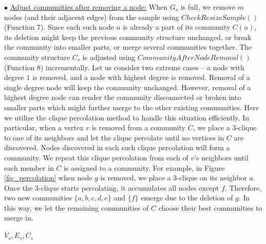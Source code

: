 \noindent$\bullet$ \underline{Adjust communities after removing a node:} When $G_s$ is full, we remove $m$ nodes (and their adjacent edges) from the sample using $CheckResizeSample()$ (Function 7). Since each such node $u$ is already a part of its community $C(u)$, its deletion might keep the previous community structure unchanged, or break the community into smaller parts, or merge several communities together. The community structure $C_s$ is adjusted using  $CommunityAfterNodeRemoval()$ (Function 8) incrementally.  Let us consider two extreme cases -- a node with degree $1$ is removed, and a node with highest degree is removed. Removal of a single degree node will keep the community unchanged. However, removal of a highest degree node can render the community disconnected or broken into smaller parts which might further merge to the other existing communities. Here we utilize the clique percolation method \cite{PalEtAl05} to handle this situation efficiently. In particular, when a vertex $v$ is removed from a community $C$, we place a 3-clique to one of its neighbors and let the clique percolate until no vertices in $C$ are discovered. Nodes discovered in each such clique percolation will form a community. We repeat this clique percolation from each of $v$'s neighbors until each member in $C$ is assigned to a community. For example, in Figure \ref{fig_percolation} when node $g$ is removed, we place a 3-clique on its neighbor $a$. Once the 3-clique starts percolating, it accumulates all nodes except $f$. Therefore, two new communities $\{a,b,c,d,e\}$ and $\{f\}$  emerge due to the deletion of $g$. In this way, we let the remaining communities of $C$ choose their best communities to merge in.%
\begin{function7}
\caption{$CheckResizeSample(V_s,C_s,n,m)$}
\Return $V_s,E_s,C_s$
\end{function7}


